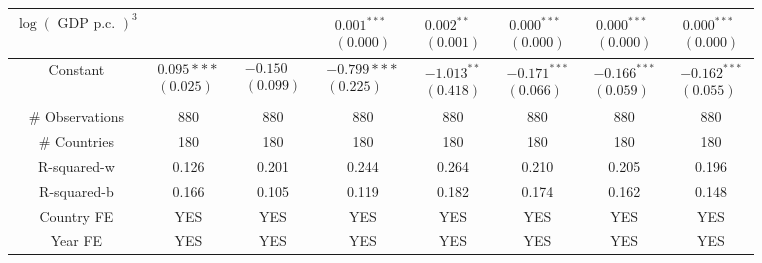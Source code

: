 \documentclass[10pt]{article}
\begin{document}
\begin{center}
\begin{tabular}{|c|c|c|c|c|c|c|c|}
\hline
$\log (\text { GDP p.c. })^{3}$ &  &  & $\begin{array}{l}0.001^{* * *} \\ (0.000)\end{array}$ & $\begin{array}{l}0.002^{* *} \\ (0.001)\end{array}$ & $\begin{array}{l}0.000^{* * *} \\ (0.000)\end{array}$ & $\begin{array}{l}0.000^{* * *} \\ (0.000)\end{array}$ & $\begin{array}{l}0.000^{* * *} \\ (0.000)\end{array}$ \\
\hline
Constant & $\begin{array}{l}0.095 * * * \\ (0.025)\end{array}$ & $\begin{array}{l}-0.150 \\ (0.099)\end{array}$ & $\begin{array}{l}-0.799 * * * \\ (0.225)\end{array}$ & $\begin{array}{l}-1.013^{* *} \\ (0.418)\end{array}$ & $\begin{array}{l}-0.171^{* * *} \\ (0.066)\end{array}$ & $\begin{array}{l}-0.166^{* * *} \\ (0.059)\end{array}$ & $\begin{array}{l}-0.162^{* * *} \\ (0.055)\end{array}$ \\
\hline
\# Observations & 880 & 880 & 880 & 880 & 880 & 880 & 880 \\
\hline
\# Countries & 180 & 180 & 180 & 180 & 180 & 180 & 180 \\
\hline
R-squared-w & 0.126 & 0.201 & 0.244 & 0.264 & 0.210 & 0.205 & 0.196 \\
\hline
R-squared-b & 0.166 & 0.105 & 0.119 & 0.182 & 0.174 & 0.162 & 0.148 \\
\hline
Country FE & YES & YES & YES & YES & YES & YES & YES \\
\hline
Year FE & YES & YES & YES & YES & YES & YES & YES \\
\hline
\end{tabular}
\end{center}
\end{document}
